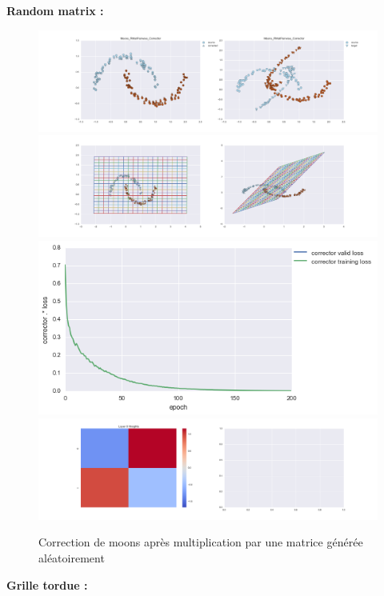 {\Large \textbf{Random matrix :}}

\begin{figure}[H] %
\centering
\includegraphics[width=\linewidth]{fig/24-05-2016/moons/Moons_RMatPairwise_Corrector-DATA.png}
\includegraphics[width=\linewidth]{fig/24-05-2016/moons/Moons_RMatPairwise_Corrector-GridCheck.png}
\includegraphics[width=0.45\linewidth]{fig/24-05-2016/moons/Moons_RMatPairwise_Corrector-Learning_curve.png}
\includegraphics[width=\linewidth]{fig/24-05-2016/moons/Moons_RMatPairwise_Corrector-W.png}
\caption{Correction de moons après multiplication par une matrice générée aléatoirement}
\label{fig:recap-moons-RMat-pairwise}
\end{figure}


{\Large \textbf{Grille tordue :}}

